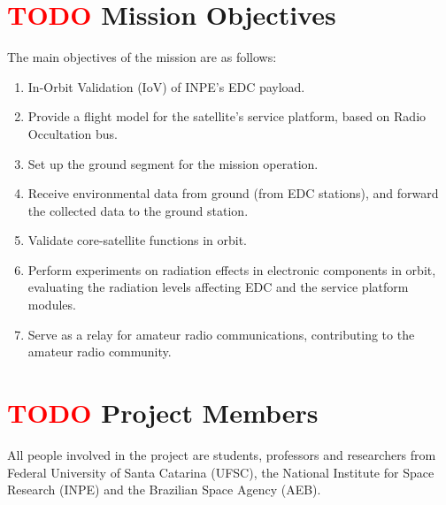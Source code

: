

\section{ \textcolor{red}{TODO} Mission Objectives}

The main objectives of the mission are as follows:

\begin{enumerate}
    \item In-Orbit Validation (IoV) of INPE's EDC payload.
    \item Provide a flight model for the satellite's service platform, based on Radio Occultation bus.
    \item Set up the ground segment for the mission operation.
    \item Receive environmental data from ground (from EDC stations), and forward the collected data to the ground station.
    \item Validate core-satellite functions in orbit.
    \item Perform experiments on radiation effects in electronic components in orbit, evaluating the radiation levels affecting EDC and the service platform modules.
    \item Serve as a relay for amateur radio communications, contributing to the amateur radio community.
\end{enumerate}

\section{ \textcolor{red}{TODO} Project Members}

All people involved in the project are students, professors and researchers from Federal University of Santa Catarina (UFSC), the National Institute for Space Research (INPE) and the Brazilian Space Agency (AEB).

